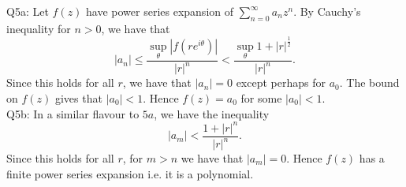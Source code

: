 \documentclass[letterpaper]{article}
\begin{document}
\noindent Q5a: Let $f(z)$ have power series expansion of $\sum_{n=0}^\infty a_n z^n$. By Cauchy's inequality for $n>0$, we have that $$|a_n| \leq \frac{\sup_{\theta} |f(re^{i \theta}) | }{|r|^n} < \frac{\sup_{\theta} 1+ |r|^\frac{1}{2}}{|r|^n}.$$ 
Since this holds for all $r$, we have that $|a_n|=0$ except perhaps for $a_0$. The bound on $f(z)$ gives that $|a_0|< 1$. Hence $f(z) = a_0$ for some $|a_0|<1$. 
\newline \\ \noindent Q5b: In a similar flavour to $5a$, we have the inequality $$|a_m| < \frac{1+ |r|^n}{|r|^n}. $$ Since this holds for all $r$, for $m > n$ we have that $|a_m| =0$. Hence $f(z)$ has a finite power series expansion i.e. it is a polynomial. 
\end{document}
